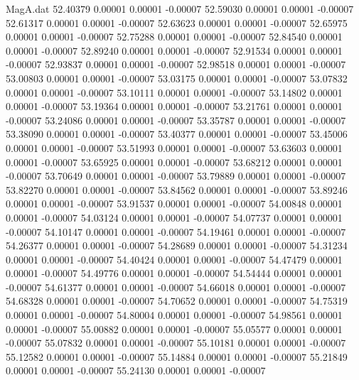 \begin{filecontents}{MagA.dat}
  52.40379    0.00001    0.00001   -0.00007
  52.59030    0.00001    0.00001   -0.00007
  52.61317    0.00001    0.00001   -0.00007
  52.63623    0.00001    0.00001   -0.00007
  52.65975    0.00001    0.00001   -0.00007
  52.75288    0.00001    0.00001   -0.00007
  52.84540    0.00001    0.00001   -0.00007
  52.89240    0.00001    0.00001   -0.00007
  52.91534    0.00001    0.00001   -0.00007
  52.93837    0.00001    0.00001   -0.00007
  52.98518    0.00001    0.00001   -0.00007
  53.00803    0.00001    0.00001   -0.00007
  53.03175    0.00001    0.00001   -0.00007
  53.07832    0.00001    0.00001   -0.00007
  53.10111    0.00001    0.00001   -0.00007
  53.14802    0.00001    0.00001   -0.00007
  53.19364    0.00001    0.00001   -0.00007
  53.21761    0.00001    0.00001   -0.00007
  53.24086    0.00001    0.00001   -0.00007
  53.35787    0.00001    0.00001   -0.00007
  53.38090    0.00001    0.00001   -0.00007
  53.40377    0.00001    0.00001   -0.00007
  53.45006    0.00001    0.00001   -0.00007
  53.51993    0.00001    0.00001   -0.00007
  53.63603    0.00001    0.00001   -0.00007
  53.65925    0.00001    0.00001   -0.00007
  53.68212    0.00001    0.00001   -0.00007
  53.70649    0.00001    0.00001   -0.00007
  53.79889    0.00001    0.00001   -0.00007
  53.82270    0.00001    0.00001   -0.00007
  53.84562    0.00001    0.00001   -0.00007
  53.89246    0.00001    0.00001   -0.00007
  53.91537    0.00001    0.00001   -0.00007
  54.00848    0.00001    0.00001   -0.00007
  54.03124    0.00001    0.00001   -0.00007
  54.07737    0.00001    0.00001   -0.00007
  54.10147    0.00001    0.00001   -0.00007
  54.19461    0.00001    0.00001   -0.00007
  54.26377    0.00001    0.00001   -0.00007
  54.28689    0.00001    0.00001   -0.00007
  54.31234    0.00001    0.00001   -0.00007
  54.40424    0.00001    0.00001   -0.00007
  54.47479    0.00001    0.00001   -0.00007
  54.49776    0.00001    0.00001   -0.00007
  54.54444    0.00001    0.00001   -0.00007
  54.61377    0.00001    0.00001   -0.00007
  54.66018    0.00001    0.00001   -0.00007
  54.68328    0.00001    0.00001   -0.00007
  54.70652    0.00001    0.00001   -0.00007
  54.75319    0.00001    0.00001   -0.00007
  54.80004    0.00001    0.00001   -0.00007
  54.98561    0.00001    0.00001   -0.00007
  55.00882    0.00001    0.00001   -0.00007
  55.05577    0.00001    0.00001   -0.00007
  55.07832    0.00001    0.00001   -0.00007
  55.10181    0.00001    0.00001   -0.00007
  55.12582    0.00001    0.00001   -0.00007
  55.14884    0.00001    0.00001   -0.00007
  55.21849    0.00001    0.00001   -0.00007
  55.24130    0.00001    0.00001   -0.00007

\end{filecontents}
